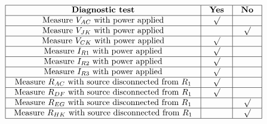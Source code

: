 \vfil

\eject







$$\vbox{\offinterlineskip
\halign{\strut
\vrule \quad\hfil # \ \hfil & 
\vrule \quad\hfil # \ \hfil & 
\vrule \quad\hfil # \ \hfil \vrule \cr
\noalign{\hrule}
%
{\bf Diagnostic test} & {\bf Yes} & {\bf No} \cr
%
\noalign{\hrule}
%
Measure $V_{AC}$ with power applied & $\surd$ &  \cr
%
\noalign{\hrule}
%
Measure $V_{JK}$ with power applied &  & $\surd$ \cr
%
\noalign{\hrule}
%
Measure $V_{CK}$ with power applied & $\surd$ &  \cr
%
\noalign{\hrule}
%
Measure $I_{R1}$ with power applied & $\surd$ &  \cr
%
\noalign{\hrule}
%
Measure $I_{R2}$ with power applied & $\surd$ &  \cr
%
\noalign{\hrule}
%
Measure $I_{R3}$ with power applied & $\surd$ &  \cr
%
\noalign{\hrule}
%
Measure $R_{AC}$ with source disconnected from $R_1$ & $\surd$ &  \cr
%
\noalign{\hrule}
%
Measure $R_{DF}$ with source disconnected from $R_1$ & $\surd$ &  \cr
%
\noalign{\hrule}
%
Measure $R_{EG}$ with source disconnected from $R_1$ &  & $\surd$ \cr
%
\noalign{\hrule}
%
Measure $R_{HK}$ with source disconnected from $R_1$ &  & $\surd$ \cr
%
\noalign{\hrule}
} %
}$$ %












